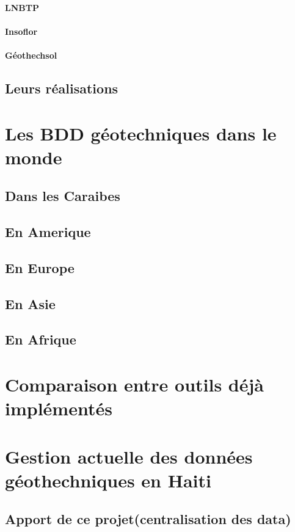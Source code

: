         \paragraph{LNBTP}
        \paragraph{Insoflor}
        \paragraph{Géothechsol}
        \subsection{Leurs réalisations}
        \lipsum[1]
        \section{Les BDD géotechniques dans le monde}
        \subsection{Dans les Caraibes}
        \lipsum[1]
        \subsection{En Amerique}
        \lipsum[1]
        \subsection{En Europe}
        \lipsum[1]
        \subsection{En Asie}
        \lipsum[1]
        \subsection{En Afrique}
        \lipsum[1]
    \section{Comparaison entre outils déjà implémentés}
    \lipsum[1]
    \section{Gestion actuelle des données géothechniques en Haiti}
    \lipsum[1]
    \subsection{Apport de ce projet(centralisation des data)}
        \lipsum[1]
